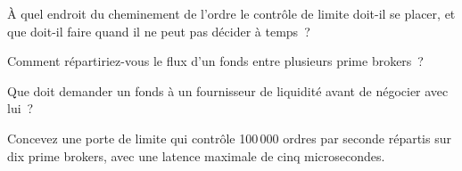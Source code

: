 \begin{interviewq}\label{iq:m2:getting-access-fx:3}
À quel endroit du cheminement de l'ordre le contrôle de limite doit-il se placer, et que doit-il faire quand il
ne peut pas décider à temps~?
\end{interviewq}

\begin{interviewq}\label{iq:m2:getting-access-fx:4}
Comment répartiriez-vous le flux d'un fonds entre plusieurs prime brokers~?
\end{interviewq}

\begin{interviewq}\label{iq:m2:getting-access-fx:5}
Que doit demander un fonds à un fournisseur de liquidité avant de négocier avec lui~?
\end{interviewq}

\begin{interviewq}\label{iq:m2:getting-access-fx:6}
Concevez une porte de limite qui contrôle 100\,000 ordres par seconde répartis sur dix prime brokers, avec
une latence maximale de cinq microsecondes.
\end{interviewq}
